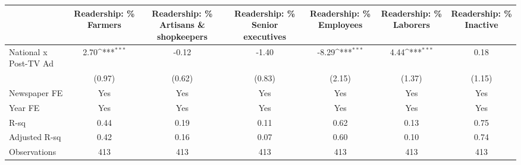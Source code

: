 {
\def\sym#1{\ifmmode^{#1}\else\(^{#1}\)\fi}
\begin{tabular}{l*{6}{c}}
\hline\hline
                    &\multicolumn{1}{c}{Readership: \% Farmers}&\multicolumn{1}{c}{Readership: \% Artisans \& shopkeepers}&\multicolumn{1}{c}{Readership: \% Senior executives}&\multicolumn{1}{c}{Readership: \% Employees}&\multicolumn{1}{c}{Readership: \% Laborers}&\multicolumn{1}{c}{Readership: \% Inactive}\\
\hline
National x Post-TV Ad&        2.70\sym{***}&       -0.12         &       -1.40         &       -8.29\sym{***}&        4.44\sym{***}&        0.18         \\
                    &      (0.97)         &      (0.62)         &      (0.83)         &      (2.15)         &      (1.37)         &      (1.15)         \\
\hline
Newspaper FE        &         Yes         &         Yes         &         Yes         &         Yes         &         Yes         &         Yes         \\
Year FE             &         Yes         &         Yes         &         Yes         &         Yes         &         Yes         &         Yes         \\
R-sq                &        0.44         &        0.19         &        0.11         &        0.62         &        0.13         &        0.75         \\
Adjusted R-sq       &        0.42         &        0.16         &        0.07         &        0.60         &        0.10         &        0.74         \\
Observations        &         413         &         413         &         413         &         413         &         413         &         413         \\
\hline\hline
\end{tabular}
}
